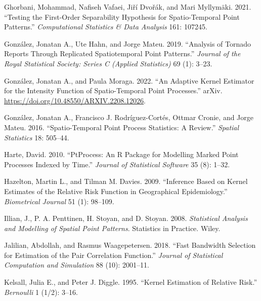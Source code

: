 \begin{CSLReferences}{1}{0}
\leavevmode{}%
Ghorbani, Mohammad, Nafiseh Vafaei, Jiří Dvořák, and Mari Myllymäki. 2021. {``Testing the First-Order Separability Hypothesis for Spatio-Temporal Point Patterns.''} \emph{Computational Statistics \& Data Analysis} 161: 107245.

\leavevmode{}%
González, Jonatan A., Ute Hahn, and Jorge Mateu. 2019. {``Analysis of Tornado Reports Through Replicated Spatiotemporal Point Patterns.''} \emph{Journal of the Royal Statistical Society: Series C (Applied Statistics)} 69 (1): 3--23.

\leavevmode{}%
González, Jonatan A., and Paula Moraga. 2022. {``An Adaptive Kernel Estimator for the Intensity Function of Spatio-Temporal Point Processes.''} arXiv. \url{https://doi.org/10.48550/ARXIV.2208.12026}.

\leavevmode{}%
González, Jonatan A., Francisco J. Rodríguez-Cortés, Ottmar Cronie, and Jorge Mateu. 2016. {``Spatio-Temporal Point Process Statistics: A Review.''} \emph{Spatial Statistics} 18: 505--44.

\leavevmode{}%
Harte, David. 2010. {``{PtProcess}: An {R} Package for Modelling Marked Point Processes Indexed by Time.''} \emph{Journal of Statistical Software} 35 (8): 1--32.

\leavevmode{}%
Hazelton, Martin L., and Tilman M. Davies. 2009. {``Inference Based on Kernel Estimates of the Relative Risk Function in Geographical Epidemiology.''} \emph{Biometrical Journal} 51 (1): 98--109.

\leavevmode{}%
Illian, J., P. A. Penttinen, H. Stoyan, and D. Stoyan. 2008. \emph{Statistical Analysis and Modelling of Spatial Point Patterns}. Statistics in Practice. Wiley.

\leavevmode{}%
Jalilian, Abdollah, and Rasmus Waagepetersen. 2018. {``Fast Bandwidth Selection for Estimation of the Pair Correlation Function.''} \emph{Journal of Statistical Computation and Simulation} 88 (10): 2001--11.

\leavevmode{}%
Kelsall, Julia E., and Peter J. Diggle. 1995. {``Kernel Estimation of Relative Risk.''} \emph{Bernoulli} 1 (1/2): 3--16.


\end{CSLReferences}
